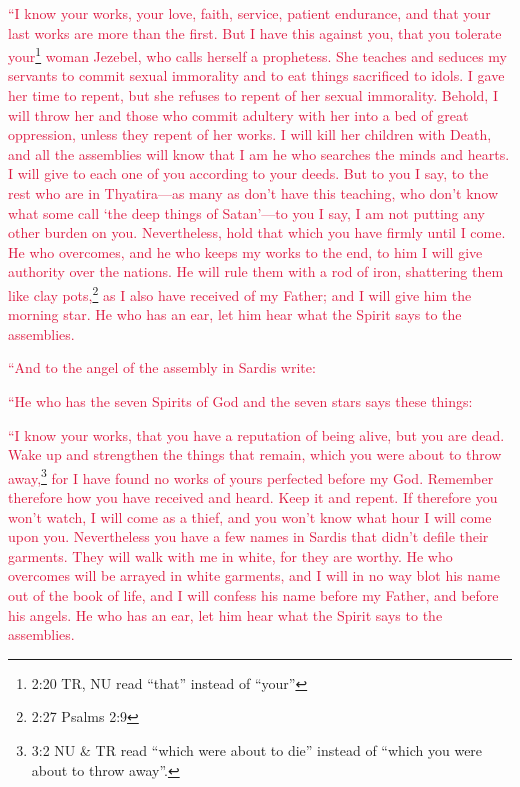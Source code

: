 \myverse{}\textcolor{crimson}{“I know your works, your love, faith, service, patient endurance,
	and that your last works are more than the first.
}
\myverse{}\textcolor{crimson}{But I have this against you, that you tolerate your}\footnote{2:20 TR, NU read “that” instead of “your”}
\textcolor{crimson}{woman Jezebel, who calls herself a prophetess. She teaches and seduces my servants to commit sexual
	immorality and to eat things sacrificed to idols.
}
\myverse{}\textcolor{crimson}{I gave her time to repent, but she refuses to repent of her sexual immorality.
}
\myverse{}\textcolor{crimson}{Behold, I will throw her and those who commit adultery with her into a
	bed of great oppression, unless they repent of her works.
}
\myverse{}\textcolor{crimson}{I will kill her children with Death, and all the assemblies will know
	that I am he who searches the minds and hearts. I will give to each one of you according to your deeds.
}
\myverse{}\textcolor{crimson}{But to you I say, to the rest who are in Thyatira—as many as don’t have
	this teaching, who don’t know what some call ‘the deep things of Satan’—to you I say, I am not putting
	any other burden on you.
}
\myverse{}\textcolor{crimson}{Nevertheless, hold that which you have firmly until I come.
}
\myverse{}\textcolor{crimson}{He who overcomes, and he who keeps my works to the end, to him I will
	give authority over the nations.
}
\myverse{}\textcolor{crimson}{He will rule them with a rod of iron, shattering them like clay pots,}\footnote{2:27 Psalms 2:9}
\textcolor{crimson}{as I also have received of my Father;
}
\myverse{}\textcolor{crimson}{and I will give him the morning star.
}
\myverse{}\textcolor{crimson}{He who has an ear, let him hear what the Spirit says to the assemblies.}



\mychapter{} \myverse*{}\textcolor{crimson}{“And to the angel of the assembly in Sardis write:}

\textcolor{crimson}{“He who has the seven Spirits of God and the seven stars says these things:}

\textcolor{crimson}{“I know your works, that you have a reputation of being alive, but you are dead.
}
\myverse{}\textcolor{crimson}{Wake up and strengthen the things that remain, which you were about to throw
	away,}\footnote{3:2 NU \& TR read “which were about to die” instead of “which you were about to throw away”.}
\textcolor{crimson}{for I have found no works of yours perfected before my God.
}
\myverse{}\textcolor{crimson}{Remember therefore how you have received and heard. Keep it and repent.
	If therefore you won’t watch, I will come as a thief, and you won’t know what hour I will come upon you.
}
\myverse{}\textcolor{crimson}{Nevertheless you have a few names in Sardis that didn’t defile their garments.
	They will walk with me in white, for they are worthy.
}
\myverse{}\textcolor{crimson}{He who overcomes will be arrayed in white garments, and I will in no way
	blot his name out of the book of life, and I will confess his name before my Father, and before his angels.
}
\myverse{}\textcolor{crimson}{He who has an ear, let him hear what the Spirit says to the assemblies.}

